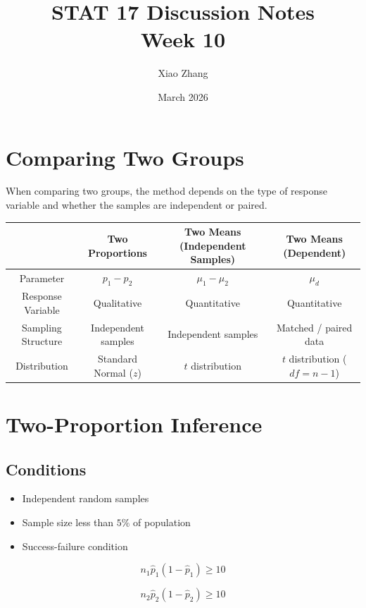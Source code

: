 \documentclass[11pt]{article}
\title{STAT 17 Discussion Notes \\ Week 10}
\date{March 2026}
\author{Xiao Zhang}
\begin{document}
\maketitle

\section{Comparing Two Groups}

When comparing two groups, the method depends on the type of response variable and whether the samples are independent or paired.

\begin{center}
\begin{tabular}{c|c|c|c}
\toprule
 & Two Proportions & Two Means (Independent Samples) & Two Means (Dependent) \\
\midrule
Parameter & $p_1 - p_2$ & $\mu_1 - \mu_2$ & $\mu_d$ \\

Response Variable & Qualitative & Quantitative & Quantitative \\

Sampling Structure & Independent samples & Independent samples & Matched / paired data \\

Distribution & Standard Normal ($z$) & $t$ distribution & $t$ distribution ($df=n-1$) \\

\bottomrule
\end{tabular}
\end{center}


\section{Two-Proportion Inference}

\subsection*{Conditions}

\begin{itemize}
\item Independent random samples
\item Sample size less than $5\%$ of population
\item Success-failure condition
\end{itemize}

\[
n_1\hat p_1(1-\hat p_1) \ge 10
\]

\[
n_2\hat p_2(1-\hat p_2) \ge 10
\]
\end{document}
